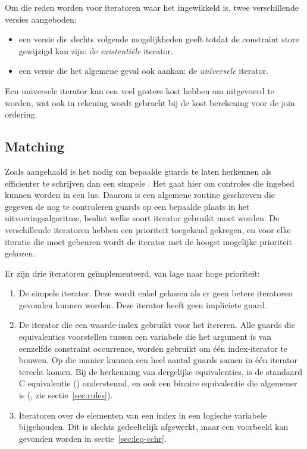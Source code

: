 Om die reden worden voor iteratoren waar het ingewikkeld is, twee verschillende versies aangeboden: \begin{itemize}
\item een versie die slechts volgende mogelijkheden geeft totdat de constraint store gewijzigd kan zijn: de {\em existenti\"ele} iterator.
\item een versie die het algemene geval ook aankan: de {\em universele} iterator.
\end{itemize}

Een universele iterator kan een veel grotere kost hebben om uitgevoerd te worden, wat ook in rekening wordt gebracht bij de kost berekening voor de join ordering.

\subsection{Matching} \label{sec:matching}

Zoals aangehaald is het nodig om bepaalde guards te laten herkennen als efficienter te schrijven dan een simpele . Het gaat hier om controles die ingebed kunnen worden in een lus. Daarom is een algemene routine geschreven die gegeven de nog te controleren guards op een bepaalde plaats in het uitvoeringsalgoritme, beslist welke soort iterator gebruikt moet worden. De verschillende iteratoren hebben een prioriteit toegekend gekregen, en voor elke iteratie die moet gebeuren wordt de iterator met de hoogst mogelijke prioriteit gekozen.

Er zijn drie iteratoren ge\"implementeerd, van lage naar hoge prioriteit: \begin{enumerate}
\item De simpele  iterator. Deze wordt enkel gekozen als er geen betere iteratoren gevonden kunnen worden. Deze iterator heeft geen impliciete guard.
\item De  iterator die een waarde-index gebruikt voor het itereren. Alle guards die equivalenties voorstellen tussen een variabele die het argument is van eenzelfde constraint occurrence, worden gebruikt om \'e\'en index-iterator te bouwen. Op die manier kunnen een heel aantal guards samen in \'e\'en iterator terecht komen. Bij de herkenning van dergelijke equivalenties, is de standaard C equivalentie (\code{==}) ondersteund, en ook een binaire equivalentie die algemener is (, zie sectie~\ref{sec:rules}).
\item Iteratoren over de elementen van een index in een logische variabele bijgehouden. Dit is slechts gedeeltelijk afgewerkt, maar een voorbeeld kan gevonden worden in sectie~\ref{sec:leq-cchr}.
\end{enumerate}

